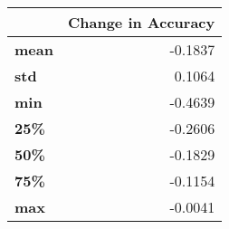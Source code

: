 \begin{tabular}{lr}
\toprule
{} &  Change in Accuracy \\
\midrule
\textbf{mean} &             -0.1837 \\
\textbf{std } &              0.1064 \\
\textbf{min } &             -0.4639 \\
\textbf{25\% } &             -0.2606 \\
\textbf{50\% } &             -0.1829 \\
\textbf{75\% } &             -0.1154 \\
\textbf{max } &             -0.0041 \\
\bottomrule
\end{tabular}
